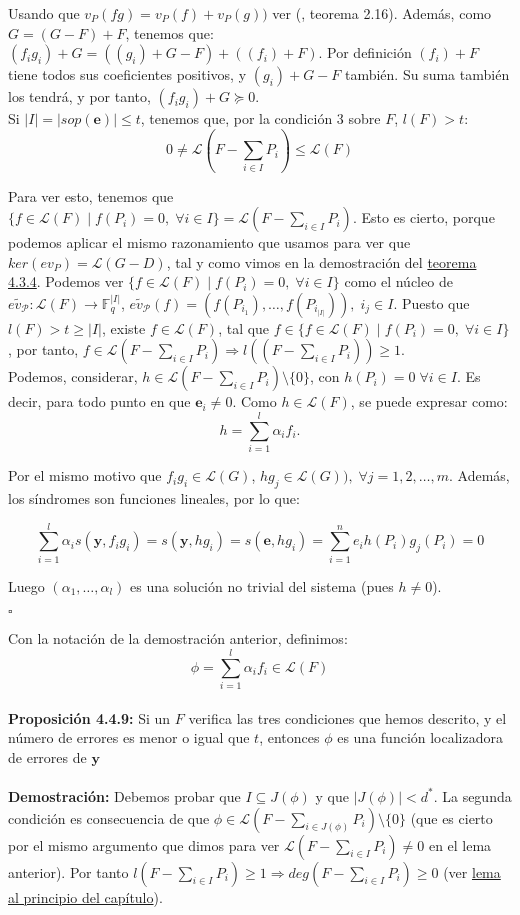 \documentclass[11pt,spanish]{book}
\newcommand{\qed}{\begin{flushright} $\square$ \end{flushright}}
\begin{document}
Usando que $v_P(fg)=v_P(f)+v_P(g))$ ver (\cite{García-Sánchez1}, teorema 2.16). Además, como $G=(G-F)+F$, tenemos que:
$(f_ig_i)+G=((g_i)+G-F)+((f_i)+F)$. Por definición $(f_i)+F$ tiene todos sus coeficientes positivos, y $(g_i)+G-F$ también. Su suma también los tendrá, y por tanto, $(f_ig_i)+G\succeq 0$.\\
Si $|I|=|sop(\mathbf{e})|\leq t$, tenemos que, por la condición $3$ sobre $F$, $l(F)>t$:
$$ 0 \neq \mathcal{L}(F-\sum_{i\in I}P_i)\leq  \mathcal{L}(F)$$

Para ver esto, tenemos que $\{f\in\mathcal{L}(F)\;|\;f(P_i)=0,\;\forall i\in I\}=\mathcal{L}(F-\sum_{i\in I}P_i) $. Esto es cierto, porque podemos aplicar el mismo razonamiento que usamos para ver que $ker(ev_P)=\mathcal{L}(G-D)$, tal y como vimos en la demostración del \hyperlink{teorema13.1.3}{teorema 4.3.4}. Podemos ver $\{f\in\mathcal{L}(F)\;|\;f(P_i)=0,\;\forall i\in I\}$ como el núcleo de $\tilde{ev_{\mathcal{P}}}:\mathcal{L}(F)\rightarrow \mathbb{F}^{|I|}_q$, $\tilde{ev_{\mathcal{P}}}(f)=(f(P_{i_1}),\ldots,f(P_{i_{|I|}})),\;i_j\in I$. Puesto que $l(F)>t\geq |I|$, existe $f\in \mathcal{L}(F)$, tal que $f\in\{f\in\mathcal{L}(F)\;|\;f(P_i)=0,\;\forall i\in I\}$, por tanto, $f\in \mathcal{L}(F-\sum_{i\in I}P_i)\Rightarrow l((F-\sum_{i\in I}P_i))\geq 1$.\\

Podemos, considerar, $h\in\mathcal{L}(F-\sum_{i\in I}P_i)\setminus\{0\}$, con $h(P_i)=0\;\forall i\in I$. Es decir, para todo punto en que $\mathbf{e}_i\neq 0$. Como $h\in\mathcal{L}(F)$, se puede expresar como:
$$h=\sum_{i=1}^{l}\alpha_{i}f_{i}.$$

Por el mismo motivo que $f_ig_i\in \mathcal{L}(G)$, $hg_j\in \mathcal{L}(G)),\;\forall j=1,2,\ldots,m$. Además, los síndromes son funciones lineales, por lo que:

$$\sum_{i=1}^{l}\alpha_{i}s(\mathbf{y},f_ig_i)=s(\mathbf{y},hg_i)=s(\mathbf{e},hg_i)=\sum_{i=1}^{n}e_i h(P_i)g_j(P_i)=0$$

Luego $(\alpha_1,\ldots,\alpha_l)$ es una solución no trivial del sistema (pues $h\neq 0$).
\qed

Con la notación de la demostración anterior, definimos:
$$\phi = \sum_{i=1}^{l}\alpha_i f_i\in\mathcal{L}(F)$$
\\ \textbf{Proposición 4.4.9: } Si un $F$ verifica las tres condiciones que hemos descrito, y el número de errores es menor o igual que $t$, entonces $\phi$ es una función localizadora de errores de $\mathbf{y}$\\
\\ \textbf{Demostración: } Debemos probar que $I\subseteq J(\phi)$ y que $|J(\phi)|<d^{*}$. La segunda condición es consecuencia de que $ \phi\in \mathcal{L}(F-\sum_{i\in J(\phi)}P_i)\setminus \{0\}$ (que es cierto por el mismo argumento que dimos para ver  $\mathcal{L}(F-\sum_{i\in I}P_i)\neq 0$ en el lema anterior).
Por tanto $l(F-\sum_{i\in I}P_i)\geq 1\Rightarrow deg(F-\sum_{i\in I}P_i)\geq 0$ (ver \hyperlink{lemaDivisores}{lema al principio del capítulo}).\\
\end{document}
